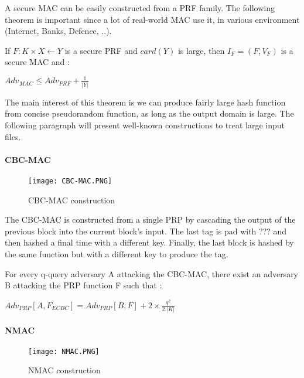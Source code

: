 A secure MAC can be easily constructed from a PRF family. The following theorem is important since a lot of real-world MAC use it, in various environment (Internet, Banks, Defence, ..). 

\begin{mytheorem}
    If $F:K\times X \leftarrow Y$ is a secure PRF and $card(Y)$ is large, then $I_F = (F, V_F)$ is a secure MAC and : 
   	\begin{flushright}
	    $ Adv_{MAC} \leq Adv_{PRF} + \frac{1}{|Y|} $
	\end{flushright}
\end{mytheorem}

The main interest of this theorem is we can produce fairly large hash function from concise pseudorandom function, as long as the output domain is large. The following paragraph will present well-known constructions to treat large input files.

\paragraph{CBC-MAC}

\begin{figure}[h!]
	\centering
		\texttt{[image: CBC-MAC.PNG]}
	\caption{CBC-MAC construction}
	\label{fig:CBCMACConstruction}
\end{figure}

The CBC-MAC is constructed from a single PRP by cascading the output of the previous block into the current block's input. The last tag is pad with ??? and then hashed a final time with a different key. Finally, the last block is hashed by the same function but with a different key to produce the tag.

\begin{mytheorem}
	For every q-query adversary A attacking the CBC-MAC, there exist an adversary B attacking the PRP function F such that : 
	\begin{flushright}
 		$Adv_{PRP}[A,F_{ECBC}] = Adv_{PRP}[B, F] + 2\times \frac{q^2}{2.|K|}$	
	\end{flushright}
\end{mytheorem}



\paragraph{NMAC}


\begin{figure}[h!]
	\centering
		\texttt{[image: NMAC.PNG]}
	\caption{NMAC construction}
	\label{fig:NMACConstruction}
\end{figure}

